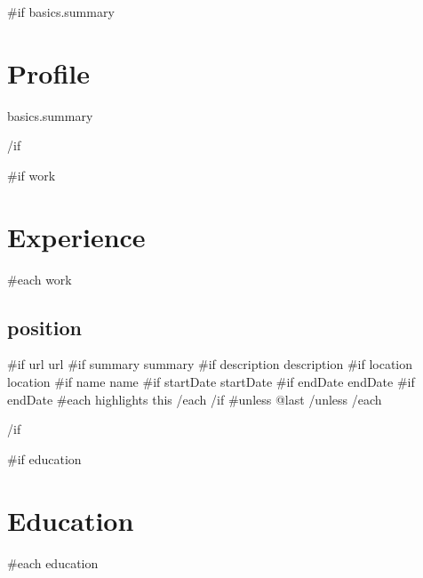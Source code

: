 \documentclass[letterpaper]{article}
\newcommand{\sectionsep}[0]{}
\newcommand{\subsectionsep}[0]{}
\begin{document}
\hspace{1em}
\textcolor{columns-divider}{\vrule width 1pt}
\hspace{1em}
\begin{minipage}[t]{0.75\textwidth} 
  \sectionfont{\bfseries\large\uppercase}
  \subsectionfont{\color{accent-600}\normalsize\bfseries}

  {{#if basics.summary}}
  \section*{Profile} {
    { {{ basics.summary }} }
  }
  \sectionsep
  {{/if}}
  
  {{#if work}}
  \section*{Experience} {
    {{#each work}}
    \subsection*{ {{ position }} } {
      {{#if url}}{{ url }}
      {{#if summary}}{{ summary }}
      {{#if description}}{{ description }}
      {{#if location}}{{ location }}
      {{#if name}}{{ name }}
      {{#if startDate}}{{ startDate }}
      {{#if endDate}}{{ endDate }}
      {{#if endDate}}
        {{#each highlights}}
          {{ this }} 
        {{/each}}\newline
      {{/if}}
    }
    {{#unless @last}} \subsectionsep {{/unless}}
    {{/each}}
  }
  \sectionsep
  {{/if}}
  
  {{#if education}}
  \section*{Education} {
    {{#each education}}
}
\end{minipage}
\end{document}
